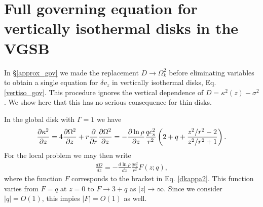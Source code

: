 \section{Full governing equation for vertically isothermal disks in
  the VGSB}\label{adia_improve}

In \S\ref{approx_gov} we made the replacement $D\to\Omega_k^2$ before
eliminating variables to obtain a single equation for $\delta v_z$ in
vertically isothermal disks, Eq. \ref{vertiso_gov}.  
This procedure ignores the vertical dependence of
$D=\kappa^2(z) - \sigma^2$. We show here that this has no serious 
consequence for thin disks. 

In the global disk with $\Gamma=1$ we have
\begin{align}\label{dkappa2}
  \frac{\partial\kappa^2}{\partial z} = 4 \frac{\partial\Omega^2}{\partial z} + r\frac{\partial}{\partial
    r}\frac{\partial\Omega^2}{\partial z} = -
  \frac{\partial\ln\rho}{\partial z}\frac{qc_s^2}{r^2} \left(2 + q +
    \frac{z^2/r^2-2}{z^2/r^2+1}\right). 
\end{align}
For the local problem we may then write
\begin{align}
  \frac{dD}{dz}  = - \frac{d\ln\rho}{dz}\frac{qc_s^2}{r^2}F(z;q),
\end{align}
where the function $F$ corresponds to the bracket in
Eq. \ref{dkappa2}. This function varies from $F=q$ at $z=0$ to $F\to
3+q$ as $|z|\to\infty$. Since we consider $|q|=O(1)$, this impies
$|F|=O(1)$ as well.  

